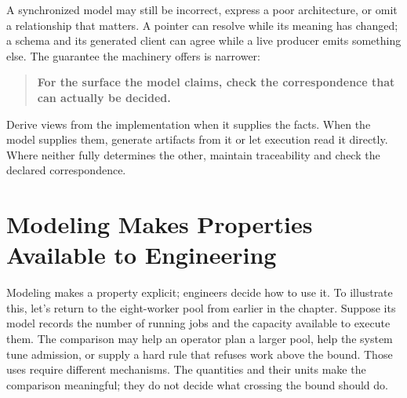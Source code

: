 
A synchronized model may still be incorrect, express a poor architecture, or omit a relationship that matters. A pointer can resolve while its meaning has changed; a schema and its generated client can agree while a live producer emits something else. The guarantee the machinery offers is narrower:

\begin{quote}
\textbf{For the surface the model claims, check the correspondence that can actually be decided.}
\end{quote}


Derive views from the implementation when it supplies the facts. When the model supplies them, generate artifacts from it or let execution read it directly. Where neither fully determines the other, maintain traceability and check the declared correspondence.

\section{Modeling Makes Properties Available to Engineering}\label{heading:modeling-makes-properties-available-to-engineering}


Modeling makes a property explicit; engineers decide how to use it. To illustrate this, let's return to the eight-worker pool from earlier in the chapter. Suppose its model records the number of running jobs and the capacity available to execute them. The comparison may help an operator plan a larger pool, help the system tune admission, or supply a hard rule that refuses work above the bound. Those uses require different mechanisms. The quantities and their units make the comparison meaningful; they do not decide what crossing the bound should do.

